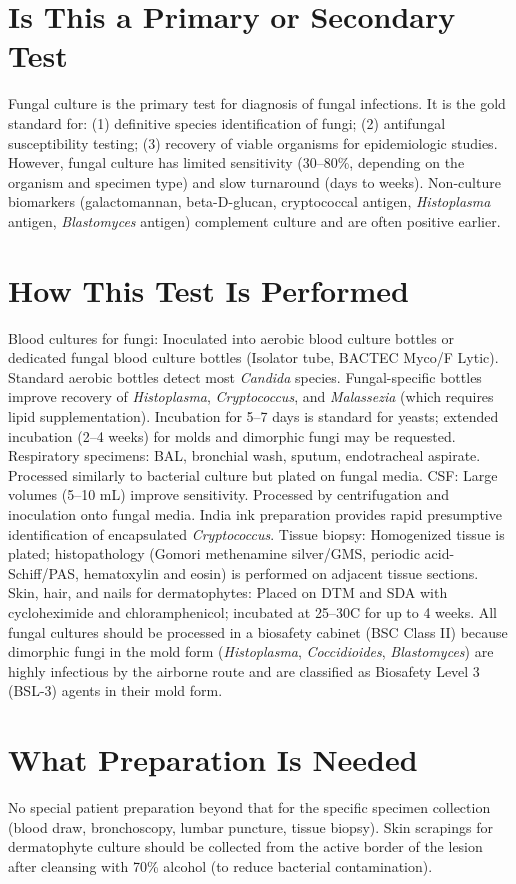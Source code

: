 \section*{Is This a Primary or Secondary Test}
Fungal culture is the primary test for diagnosis of fungal infections. It is the gold standard for: (1) definitive species identification of fungi; (2) antifungal susceptibility testing; (3) recovery of viable organisms for epidemiologic studies. However, fungal culture has limited sensitivity (30--80\%, depending on the organism and specimen type) and slow turnaround (days to weeks). Non-culture biomarkers (galactomannan, beta-D-glucan, cryptococcal antigen, \textit{Histoplasma} antigen, \textit{Blastomyces} antigen) complement culture and are often positive earlier.

\section*{How This Test Is Performed}
Blood cultures for fungi: Inoculated into aerobic blood culture bottles or dedicated fungal blood culture bottles (Isolator tube, BACTEC Myco/F Lytic). Standard aerobic bottles detect most \textit{Candida} species. Fungal-specific bottles improve recovery of \textit{Histoplasma}, \textit{Cryptococcus}, and \textit{Malassezia} (which requires lipid supplementation). Incubation for 5--7 days is standard for yeasts; extended incubation (2--4 weeks) for molds and dimorphic fungi may be requested. Respiratory specimens: BAL, bronchial wash, sputum, endotracheal aspirate. Processed similarly to bacterial culture but plated on fungal media. CSF: Large volumes (5--10 mL) improve sensitivity. Processed by centrifugation and inoculation onto fungal media. India ink preparation provides rapid presumptive identification of encapsulated \textit{Cryptococcus}. Tissue biopsy: Homogenized tissue is plated; histopathology (Gomori methenamine silver/GMS, periodic acid-Schiff/PAS, hematoxylin and eosin) is performed on adjacent tissue sections. Skin, hair, and nails for dermatophytes: Placed on DTM and SDA with cycloheximide and chloramphenicol; incubated at 25--30\textdegree{}C for up to 4 weeks. All fungal cultures should be processed in a biosafety cabinet (BSC Class II) because dimorphic fungi in the mold form (\textit{Histoplasma}, \textit{Coccidioides}, \textit{Blastomyces}) are highly infectious by the airborne route and are classified as Biosafety Level 3 (BSL-3) agents in their mold form.

\section*{What Preparation Is Needed}
No special patient preparation beyond that for the specific specimen collection (blood draw, bronchoscopy, lumbar puncture, tissue biopsy). Skin scrapings for dermatophyte culture should be collected from the active border of the lesion after cleansing with 70\% alcohol (to reduce bacterial contamination).

